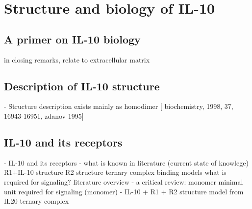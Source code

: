 \chapter{Structure and biology of IL-10}


\section{A primer on IL-10 biology}

        in closing remarks, relate to extracellular matrix

\section{Description of IL-10 structure}

    - Structure description
        exists mainly as homodimer [
            biochemistry, 1998, 37, 16943-16951, zdanov 1995]

\section{IL-10 and its receptors}

    - IL-10 and its receptors
        - what is known in literature (current state of knowlege)
            R1+IL-10 structure
            R2 structure
            ternary complex binding models
            what is required for signaling? literature overview
        - a critical review: monomer
            minimal unit required for signaling (monomer)
        - IL-10 + R1 + R2 structure model from IL20 ternary complex


\lipsum[1-5]